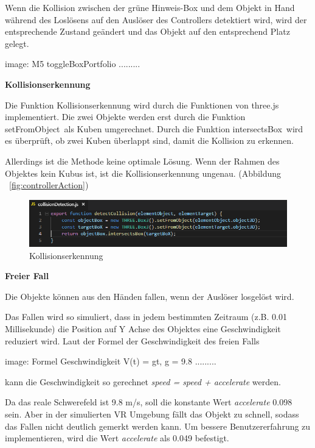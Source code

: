   Wenn die Kollision zwischen der grüne Hinweis-Box und dem Objekt in Hand während des Loslösens auf den Auslöser des Controllers detektiert wird, wird der entsprechende Zustand geändert und das Objekt auf den entsprechend Platz gelegt.
  
  image: M5 toggleBoxPortfolio .........
  
  \textbf{Kollisionserkennung}
  
  Die Funktion Kollisionserkennung wird durch die Funktionen von three.js implementiert. Die zwei Objekte werden erst durch die Funktion \glqq setFromObject\grqq\ als Kuben umgerechnet. Durch die Funktion \glqq intersectsBox\grqq\ wird es überprüft, ob zwei Kuben überlappt sind, damit die Kollision zu erkennen.
  
  Allerdings ist die Methode keine optimale Lösung. Wenn der Rahmen des Objektes kein Kubus ist, ist die Kollisionserkennung ungenau. (Abbildung ~\ref{fig:controllerAction})
  
\begin{figure}[ht]
\vspace*{0.3cm}
\centering
\includegraphics[width=\textwidth]{images/collisionDetection.png}
\caption[Kollisionserkennung]{Kollisionserkennung}
\label{fig:collisionDetection} 
\end{figure}
  
  \textbf{Freier Fall}
  
  Die Objekte können aus den Händen fallen, wenn der Auslöser losgelöst wird.
  
  Das Fallen wird so simuliert, dass in jedem bestimmten Zeitraum (z.B. 0.01 Millisekunde) die Position auf Y Achse des Objektes eine Geschwindigkeit reduziert wird. Laut der Formel der Geschwindigkeit des freien Falls 
  
  image: Formel Geschwindigkeit V(t) = gt, g = 9.8 .........
  
  kann die Geschwindigkeit so gerechnet \textit{speed = speed + accelerate} werden. 
  
  Da das reale Schwerefeld ist 9.8 m/s, soll die konstante Wert \textit{accelerate} 0.098 sein. Aber in der simulierten VR Umgebung fällt das Objekt zu schnell, sodass das Fallen nicht deutlich gemerkt werden kann. Um bessere Benutzererfahrung zu implementieren, wird die Wert \textit{accelerate} als 0.049 befestigt.
  

